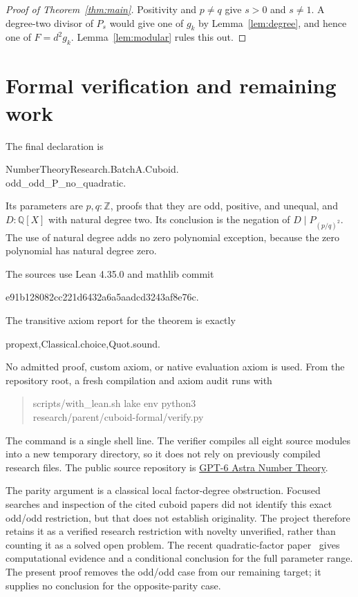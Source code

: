 \documentclass[11pt]{article}
\newcommand{\Q}{\mathbb Q}
\newcommand{\Z}{\mathbb Z}
\begin{document}
\begin{proof}[Proof of Theorem~\ref{thm:main}]
Positivity and $p\ne q$ give $s>0$ and $s\ne1$.
A degree-two divisor of $P_s$ would give one of $g_k$ by
Lemma~\ref{lem:degree}, and hence one of $F=d^2g_k$.
Lemma~\ref{lem:modular} rules this out.
\end{proof}

\clearpage
\section{Formal verification and remaining work}
The final declaration is
\begin{center}\small\ttfamily
NumberTheoryResearch.BatchA.Cuboid.\\odd\_odd\_P\_no\_quadratic.
\end{center}
Its parameters are $p,q:\Z$, proofs that they are odd, positive, and
unequal, and $D:\Q[X]$ with natural degree two. Its conclusion is the
negation of $D\mid P_{(p/q)^2}$. The use of natural degree adds no zero
polynomial exception, because the zero polynomial has natural degree zero.

The sources use Lean 4.35.0 and mathlib commit
\begin{center}\small\ttfamily
e91b128082cc221d6432a6a5aadcd3243af8e76c.
\end{center}
The transitive axiom report for the theorem is exactly
\begin{center}\small\ttfamily
propext,\quad Classical.choice,\quad Quot.sound.
\end{center}
No admitted proof, custom axiom, or native evaluation axiom is used.
From the repository root, a fresh compilation and axiom audit runs with
\begin{quote}\small\ttfamily
scripts/with\_lean.sh lake env python3\\
research/parent/cuboid-formal/verify.py
\end{quote}
The command is a single shell line. The verifier compiles all eight source
modules into a new temporary directory, so it does not rely on previously
compiled research files. The public source repository is
\href{https://github.com/NoahWLono/GPT-6-Astra-Number-Theory}{GPT-6 Astra Number Theory}.

The parity argument is a classical local factor-degree obstruction.
Focused searches and inspection of the cited cuboid papers did not identify
this exact odd/odd restriction, but that does not establish originality.
The project therefore retains it as a verified research restriction with
novelty unverified, rather than counting it as a solved open problem.
The recent quadratic-factor paper~\cite{asiryan-rathbun} gives computational
evidence and a conditional conclusion for the full parameter range.
The present proof removes the odd/odd case from our remaining target;
it supplies no conclusion for the opposite-parity case.
\end{document}
